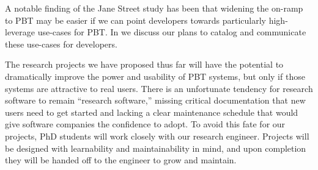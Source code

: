 
%
A notable finding of the Jane Street study has been that widening the
on-ramp to PBT may be easier if we can point developers towards particularly
high-leverage use-cases for PBT. In  we discuss our plans
to catalog and communicate these use-cases for developers.



%
The research projects we have proposed thus far will have the potential to
dramatically improve the power and usability of PBT systems, but only if those
systems are attractive to real users. There is an unfortunate tendency for
research software to remain ``research software,'' missing critical
documentation that new users need to get started and lacking a clear
maintenance schedule that would give software companies the confidence to adopt.
To avoid this fate for our projects, PhD students will work closely with our
research engineer. Projects will be designed with learnability and
maintainability in mind, and upon completion they will be handed off to the
engineer to grow and maintain.

